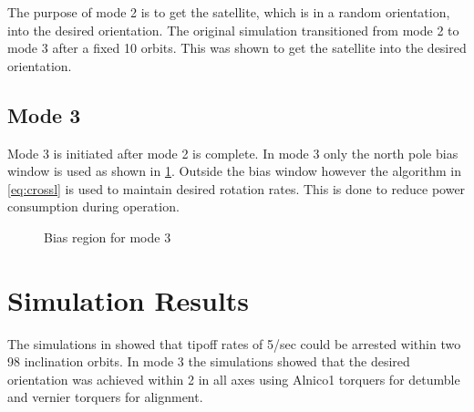 The purpose of mode 2 is to get the satellite, which is in a random orientation, into the desired orientation. The original simulation transitioned from mode 2 to mode 3 after a fixed 10 orbits. This was shown to get the satellite into the desired orientation.

\subsection{Mode 3}

Mode 3 is initiated after mode 2 is complete. In mode 3 only the north pole bias window is used as shown in \cref{fig:m3b}. Outside the bias window however the algorithm in \cref{eq:crossl} is used to maintain desired rotation rates. This is done to reduce power consumption during operation.

\begin{figure}[htb!]
    \centering
    
    \caption{Bias region for mode 3}
    \label{fig:m3b}
\end{figure}

\section{Simulation Results}

The simulations in \cite{Mentch11} showed that tipoff rates of 5\textdegree/sec could be arrested within two 98\textdegree{} inclination orbits. In mode 3 the simulations showed that the desired orientation was achieved within 2\textdegree{} in all axes using Alnico1 torquers for detumble and vernier torquers for alignment.


